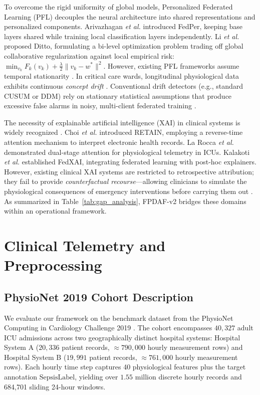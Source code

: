 \documentclass[final,5p,times,twocolumn]{elsarticle}
\begin{document}
To overcome the rigid uniformity of global models, Personalized Federated Learning (PFL) decouples the neural architecture into shared representations and personalized components. Arivazhagan \textit{et al.} \cite{arivazhagan2020} introduced FedPer, keeping base layers shared while training local classification layers independently. Li \textit{et al.} \cite{li2021ditto} proposed Ditto, formulating a bi-level optimization problem trading off global collaborative regularization against local empirical risk: $\min_{v_k} F_k(v_k) + \frac{\lambda}{2} \|v_k - w^*\|^2$. However, existing PFL frameworks assume temporal stationarity \cite{wang2025personalized,yuan2024trend}. In critical care wards, longitudinal physiological data exhibits continuous \textit{concept drift} \cite{jothimurugesan2022,bernardi2023adaptive}. Conventional drift detectors (e.g., standard CUSUM or DDM) rely on stationary statistical assumptions that produce excessive false alarms in noisy, multi-client federated training \cite{bernardi2023adaptive}.

The necessity of explainable artificial intelligence (XAI) in clinical systems is widely recognized \cite{lundberg2018explainable,sundararajan2017axiomatic}. Choi \textit{et al.} \cite{choi2016retain} introduced RETAIN, employing a reverse-time attention mechanism to interpret electronic health records. La Rocca \textit{et al.} \cite{larocca2021attention} demonstrated dual-stage attention for physiological telemetry in ICUs. Kalakoti \textit{et al.} \cite{kalakoti2025fedxai} established FedXAI, integrating federated learning with post-hoc explainers. However, existing clinical XAI systems are restricted to retrospective attribution; they fail to provide \textit{counterfactual recourse}---allowing clinicians to simulate the physiological consequences of emergency interventions before carrying them out \cite{larocca2022shap}. As summarized in Table~\ref{tab:gap_analysis}, FPDAF-v2 bridges these domains within an operational framework.

\section{Clinical Telemetry and Preprocessing}
\subsection{PhysioNet 2019 Cohort Description}
We evaluate our framework on the benchmark dataset from the PhysioNet Computing in Cardiology Challenge 2019 \cite{reyna2020physionet}. The cohort encompasses $40,327$ adult ICU admissions across two geographically distinct hospital systems: Hospital System A ($20,336$ patient records, $\approx 790,000$ hourly measurement rows) and Hospital System B ($19,991$ patient records, $\approx 761,000$ hourly measurement rows). Each hourly time step captures 40 physiological features plus the target annotation $\text{SepsisLabel}$, yielding over $1.55$ million discrete hourly records and 684,701 sliding 24-hour windows.
\end{document}
